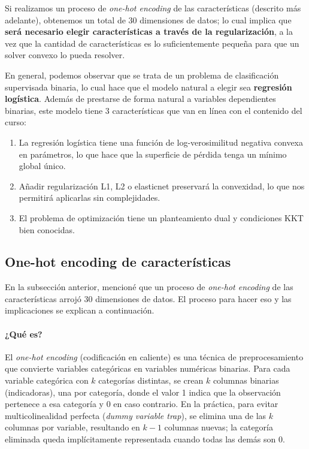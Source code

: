 \documentclass[spanish]{article}
\begin{document}
Si realizamos un proceso de \textit{one-hot encoding} de las características (descrito más adelante), obtenemos un total de 30 dimensiones de datos; lo cual implica que \textbf{será necesario elegir características a través de la regularización}, a la vez que la cantidad de características es lo suficientemente pequeña para que un solver convexo lo pueda resolver.

En general, podemos observar que se trata de un problema de clasificación supervisada binaria, lo cual hace que el modelo natural a elegir sea \textbf{regresión logística}. Además de prestarse de forma natural a variables dependientes binarias, este modelo tiene 3 características que van en línea con el contenido del curso:

\begin{enumerate}
   \item La regresión logística tiene una función de log-verosimilitud negativa convexa en parámetros, lo que hace que la superficie de pérdida tenga un mínimo global único.
   \item Añadir regularización L1, L2 o elasticnet preservará la convexidad, lo que nos permitirá aplicarlas sin complejidades.
   \item El problema de optimización tiene un planteamiento dual y condiciones KKT bien conocidas.
\end{enumerate}



\subsection{One-hot encoding de características}

En la subsección anterior, mencioné que un proceso de \textit{one-hot encoding} de las características arrojó 30 dimensiones de datos. El proceso para hacer eso y las implicaciones se explican a continuación.

\paragraph{¿Qué es?} El \textit{one-hot encoding} (codificación en caliente) es una técnica de preprocesamiento que convierte variables categóricas en variables numéricas binarias. Para cada variable categórica con $k$ categorías distintas, se crean $k$ columnas binarias (indicadoras), una por categoría, donde el valor 1 indica que la observación pertenece a esa categoría y 0 en caso contrario. En la práctica, para evitar multicolinealidad perfecta (\textit{dummy variable trap}), se elimina una de las $k$ columnas por variable, resultando en $k-1$ columnas nuevas; la categoría eliminada queda implícitamente representada cuando todas las demás son 0.
\end{document}
